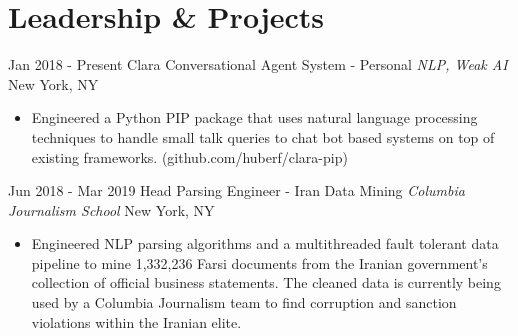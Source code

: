 \documentclass[letterpaper]{moderncv}        %
\begin{document}
    \section{Leadership \& Projects}
\cventry
{Jan 2018 - Present}
{Clara Conversational Agent System - Personal}
{}
{\textit{NLP, Weak AI}}
{New York, NY}
{\begin{itemize}%
	\item Engineered a Python PIP package that uses natural language processing techniques to handle small talk queries to chat bot based systems on top of existing frameworks. (github.com/huberf/clara-pip)
\end{itemize}}
\iffalse
\cventry
{Jan 2015 - Present}
{Personal Assistant and Learner (PAL) - Personal}
{}
{\textit{NLP, Weak AI}}
{Winchester, TN}
{\begin{itemize}%
	\item Developed a robust voice and text UI handling both intent parsing as well as execution of "skills" built on the skills framework. Employs TensorFlow to determine context. (github.com/huberf/pal)
\end{itemize}}
\fi
\iffalse
\cventry
{Sep 2015 - Aug 2016}
{Hop Around Huntsville - President}
{}
{\textit{Data Streams, Geospatial}}
{Huntsville, AL}
{\begin{itemize}%
\item Constructed back-end system built for Huntsville, AL government to publicly track their bus network. Employs websockets for real time location delivery. (github.com/codeforhuntsville/transitTracks)
\end{itemize}}
\fi
\iffalse
\cventry
{Sep 2016 - Present}
{Quantified Self - Personal}
{}
{\textit{Data Collection, Prediction and Inference}}
{New York, NY}
{\begin{itemize}%
\item Collected millions of data points (e.g. heart rate variability, coffee intake, task
completion rate) and write systems to analyze and offer suggestions to improve myself. Employed TensorFlow models to derive correlations.
\end{itemize}}
\fi
\cventry
{Jun 2018 - Mar 2019}
{Head Parsing Engineer - Iran Data Mining}
{}
{\textit{Columbia Journalism School}}
{New York, NY}
{\begin{itemize}%
	\item Engineered NLP parsing algorithms and a multithreaded fault tolerant data pipeline to mine 1,332,236 Farsi documents from the Iranian government's collection of official business statements. The cleaned data is currently being used by a Columbia Journalism team to find corruption and sanction violations within the Iranian elite.
\end{itemize}}
    
\end{document}
